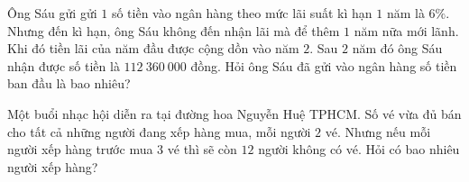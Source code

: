 \begin{bt}%
Ông Sáu gửi gửi $1$ số tiền vào ngân hàng theo mức lãi suất kì hạn $1$ năm là $6\%$. Nhưng đến kì hạn, ông Sáu không đến nhận lãi mà để thêm $1$ năm nữa mới lãnh. Khi đó tiền lãi của năm đầu được cộng dồn vào năm $2$. Sau $2$ năm đó ông Sáu nhận được số tiền là $112\: 360\: 000$ đồng. Hỏi ông Sáu đã gửi vào ngân hàng số tiền ban đầu là bao nhiêu?	
\end{bt}

\begin{bt}%
	Một buổi nhạc hội diễn ra tại đường hoa Nguyễn Huệ TPHCM. Số vé vừa đủ bán cho tất cả những người đang xếp hàng mua, mỗi người $2$ vé. Nhưng nếu mỗi người xếp hàng trước mua $3$ vé thì sẽ còn $12$ người không có vé. Hỏi có bao nhiêu người xếp hàng?
\end{bt}

